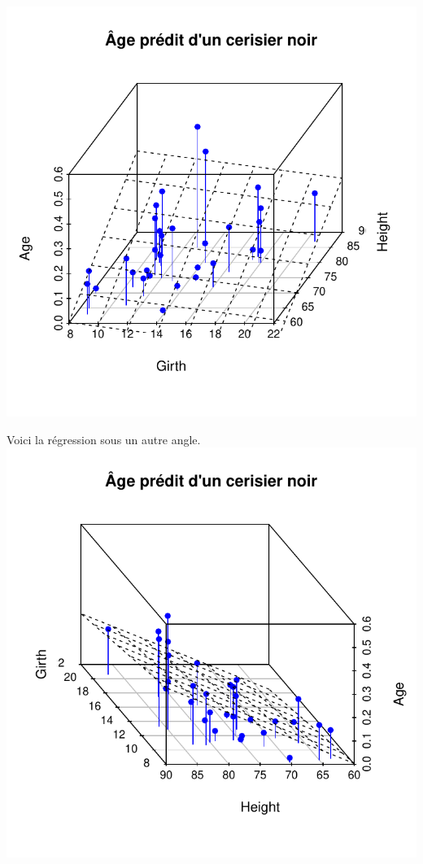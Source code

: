 \documentclass[11pt,french]{report}
\begin{document}
\includegraphics{notes_de_cours-002}

Voici la régression sous un autre angle.
\includegraphics{notes_de_cours-003}
\end{document}
